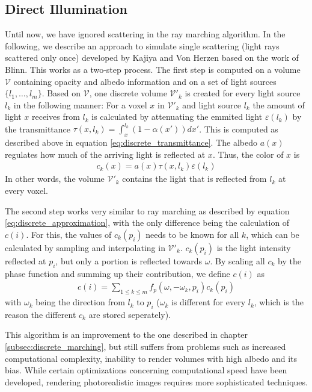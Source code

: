 \subsection{Direct Illumination}\label{subsec:direct_illumination}
Until now, we have ignored scattering in the ray marching algorithm. In the following, we describe an approach to simulate single scattering (light rays scattered only once) developed by Kajiya and Von Herzen\cite{10.1145/964965.808594} based on the work of Blinn\cite{10.1145/965145.801255}.
This works as a two-step process.
The first step is computed on a volume $\mathcal{V}$ containing opacity and albedo information and on a set of light sources $\{l_1, \ldots, l_m\}$.
Based on $\mathcal{V}$, one discrete volume $\mathcal{V}'_k$ is created for every light source $l_k$ in the following manner:
For a voxel ${x}$ in $\mathcal{V}'_k$ and light source $l_k$ the amount of light ${x}$ receives from $l_k$ is calculated by attenuating the emmited light $\varepsilon(l_k)$ by the transmittance $\tau({x}, l_k) = \int_{{x}}^{l_k}(1 - \alpha({x'}))d{x'}$. This is computed as described above in equation \ref{eq:discrete_transmittance}.
 The albedo $a({x})$ regulates how much of the arriving light is reflected at ${x}$. Thus, the color of ${x}$ is
\begin{align*}
c_k({x}) = a({x}) \tau({x}, l_k) \varepsilon(l_k)
\end{align*}
In other words, the volume $\mathcal{V}'_k$ contains the light that is reflected from $l_k$ at every voxel.

The second step works very similar to ray marching as described by equation \ref{eq:discrete_approximation}, with the only difference being the calculation of $c(i)$. For this, the values of $c_k(p_i)$ needs to be known for all $k$, which can be calculated by sampling and interpolating in $\mathcal{V}'_k$.
$c_k(p_i)$ is the light intensity reflected at $p_i$, but only a portion is reflected towards $\omega$. By scaling all $c_k$ by the phase function and summing up their contribution, we define $c(i)$ as
\begin{align*}
c(i) = \sum_{1 \le k \le m} f_p(\omega, -\omega_k, p_i)c_k(p_i)
\end{align*}
with $\omega_k$ being the direction from $l_k$ to $p_i$ ($\omega_k$ is different for every $l_k$, which is the reason the different $c_k$ are stored seperately).


This algorithm is an improvement to the one described in chapter \ref{subsec:discrete_marching}, but still suffers from problems such as increased computational complexity, inability to render volumes with high albedo \cite{10.1145/964965.808594} and its bias\cite{10.1145/3451256}. While certain optimizations concerning computational speed have been developed\cite{10.1145/78964.78965, 10.1145/147130.147155}, rendering photorealistic images requires more sophisticated techniques.











